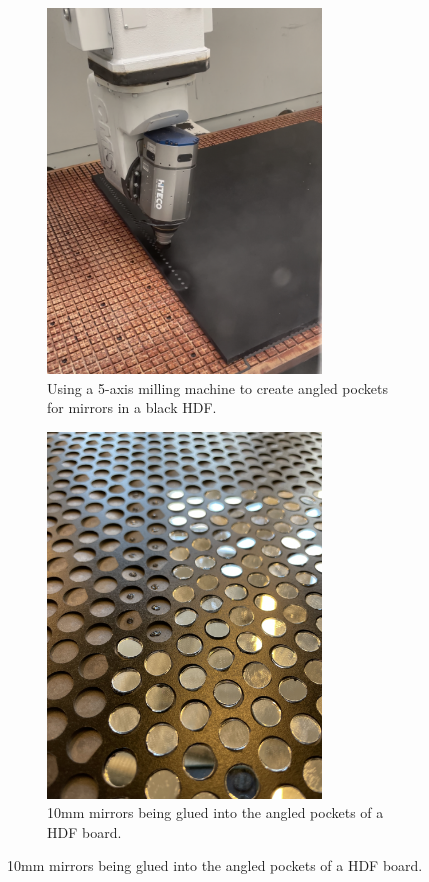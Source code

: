 \documentclass{article}
\begin{document}
\begin{figure}[ht!]
  \centering
  \begin{subfigure}[t]{0.45\textwidth}
    \includegraphics[width=0.8\textwidth]{images/milling.jpeg}
    \caption{Using a 5-axis milling machine to create angled pockets for mirrors in a black HDF.}
  \end{subfigure}
  \hfill
  \begin{subfigure}[t]{0.45\textwidth}
    \centering
    \includegraphics[width=0.8\textwidth]{images/mirror_pockets.png}
    \caption{10mm mirrors being glued into the angled pockets of a HDF board.}
  \end{subfigure}
\end{figure}
\end{document}
